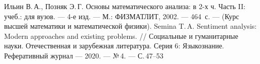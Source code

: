 \begin{thebibliography}{1}

{Ильин В.\,А., Позняк Э.\,Г.} {Основы математического анализа: в 2\nobreakdash-х ч. Часть II: учеб.: для
вузов.}
--- 4\nobreakdash-е изд.
--- М.: ФИЗМАТЛИТ, 2002. --- 464~с.
---
(Курс высшей математики и математической физики).
%
%
%
{Semina T.\,A.}
{Sentiment analysis: Modern approaches and existing
problems.}
//
Социальные и гуманитарные науки. Отечественная и зарубежная литература. Серия 6: Языкознание. Реферативный журнал
---
2020.
---
№\,4.
---
С.\,47\nobreakdash--53
%
%
%
%
%
%
%
%
%
%
%
%
%
%
%
%
%
%
%
%
%
%
%
%
%
%
%
%
%
%
%
%
%
%
%
%
%
%
%
%
%
%
%
%
%
%
%
%
%
%

\end{thebibliography}

